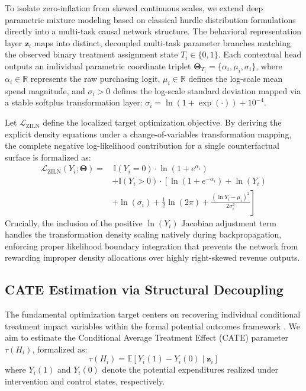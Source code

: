 \documentclass[10pt, conference]{IEEEtran}
\begin{document}
To isolate zero-inflation from skewed continuous scales, we extend deep parametric mixture modeling \cite{Wang2019} based on classical hurdle distribution formulations \cite{Mullahy1986, Lambert1992} directly into a multi-task causal network structure. The behavioral representation layer $\mathbf{z}_i$ maps into distinct, decoupled multi-task parameter branches matching the observed binary treatment assignment state $T_i \in \{0, 1\}$. Each contextual head outputs an individual parametric coordinate triplet $\mathbf{\Theta}_{T_i} = \{ \alpha_{i}, \mu_{i}, \sigma_{i} \}$, where $\alpha_i \in \mathbb{R}$ represents the raw purchasing logit, $\mu_i \in \mathbb{R}$ defines the log-scale mean spend magnitude, and $\sigma_i > 0$ defines the log-scale standard deviation mapped via a stable softplus transformation layer: $\sigma_i = \ln(1 + \exp(\cdot)) + 10^{-4}$.

Let $\mathcal{L}_{\text{ZILN}}$ define the localized target optimization objective. By deriving the explicit density equations under a change-of-variables transformation mapping, the complete negative log-likelihood contribution for a single counterfactual surface is formalized as:
\begin{equation}
\begin{split}
\mathcal{L}_{\text{ZILN}}(Y_i; \mathbf{\Theta}) = & \, \mathbb{I}(Y_i = 0) \cdot \ln(1 + e^{\alpha_i}) \\
& + \mathbb{I}(Y_i > 0) \cdot \left[ \ln(1 + e^{-\alpha_i}) + \ln(Y_i) \right. \\
& \left. + \ln(\sigma_i) + \frac{1}{2}\ln(2\pi) + \frac{(\ln Y_i - \mu_i)^2}{2\sigma_i^2} \right]
\end{split}
\end{equation}
Crucially, the inclusion of the positive $\ln(Y_i)$ Jacobian adjustment term handles the transformation density scaling natively during backpropagation, enforcing proper likelihood boundary integration that prevents the network from rewarding improper density allocations over highly right-skewed revenue outputs.

\subsection{CATE Estimation via Structural Decoupling}
The fundamental optimization target centers on recovering individual conditional treatment impact variables within the formal potential outcomes framework \cite{Rubin1974, Rosenbaum1983}. We aim to estimate the Conditional Average Treatment Effect (CATE) parameter $\tau(H_i)$, formalized as:
\begin{equation}
\tau(H_i) = \mathbb{E}[Y_i(1) - Y_i(0) \mid \mathbf{z}_i]
\end{equation}
where $Y_i(1)$ and $Y_i(0)$ denote the potential expenditures realized under intervention and control states, respectively.
\end{document}
